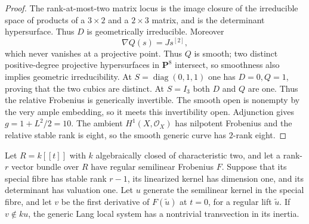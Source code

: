 \begin{proof}
The rank-at-most-two matrix locus is the image closure of the
irreducible space of products of a $3\times2$ and a $2\times3$
matrix, and is the determinant hypersurface. Thus $D$ is
geometrically irreducible. Moreover
\[
                  \nabla Q(s)=Js^{[2]},
\]
which never vanishes at a projective point. Thus $Q$ is smooth;
two distinct positive-degree projective hypersurfaces in $\mathbf P^8$
intersect, so smoothness also implies geometric irreducibility.
At $S=\operatorname{diag}(0,1,1)$ one has $D=0,Q=1$, proving that
the two cubics are distinct. At $S=I_3$ both $D$ and $Q$ are one.
Thus the relative Frobenius is generically invertible.
The smooth open is nonempty by the very ample embedding, so it meets
this invertibility open. Adjunction gives $g=1+L^2/2=10$.
The ambient $H^1(X,\mathcal O_X)$ has nilpotent Frobenius and the
relative stable rank is eight, so the smooth generic curve has
$2$-rank eight.
\end{proof}

\begin{lemma}
\label{lem:ss-simple-pole-transvection}
Let $R=k[[t]]$ with $k$ algebraically closed of characteristic two,
and let a rank-$r$ vector bundle over $R$ have regular semilinear
Frobenius $F$. Suppose that its special fibre has stable rank $r-1$,
its linearized kernel has dimension one, and its determinant has
valuation one. Let $u$ generate the semilinear kernel in the special
fibre, and let $v$ be the first derivative of $F(\widetilde u)$ at
$t=0$, for a regular lift $\widetilde u$. If $v\notin ku$, the
generic Lang local system has a nontrivial transvection in its inertia.
\end{lemma}

